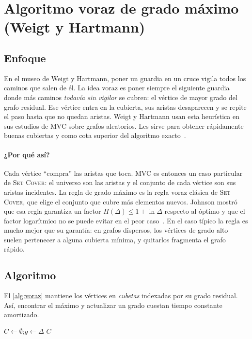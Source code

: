 \section{Algoritmo voraz de grado máximo (Weigt y Hartmann)}\label{sec:voraz}

\subsection{Enfoque}
En el museo de Weigt y Hartmann, poner un guardia en un cruce vigila todos los caminos que salen de él. La idea voraz es poner siempre el siguiente guardia donde más caminos \emph{todavía sin vigilar} se cubren: el vértice de mayor grado del grafo residual. Ese vértice entra en la cubierta, sus aristas desaparecen y se repite el paso hasta que no quedan aristas. Weigt y Hartmann usan esta heurística en sus estudios de MVC sobre grafos aleatorios. Les sirve para obtener rápidamente buenas cubiertas y como cota superior del algoritmo exacto~\citep{weigt2000,weigt2001}.

\paragraph{¿Por qué así?} Cada vértice ``compra'' las aristas que toca. MVC es entonces un caso particular de \textsc{Set Cover}: el universo son las aristas y el conjunto de cada vértice son sus aristas incidentes. La regla de grado máximo es la regla voraz clásica de \textsc{Set Cover}, que elige el conjunto que cubre más elementos nuevos. Johnson mostró que esa regla garantiza un factor $H(\Delta)\le 1+\ln\Delta$ respecto al óptimo y que el factor logarítmico no se puede evitar en el peor caso~\citep{johnson1974}. En el caso típico la regla es mucho mejor que su garantía: en grafos dispersos, los vértices de grado alto suelen pertenecer a alguna cubierta mínima, y quitarlos fragmenta el grafo rápido.

\subsection{Algoritmo}
El \cref{alg:voraz} mantiene los vértices en \emph{cubetas} indexadas por su grado residual. Así, encontrar el máximo y actualizar un grado cuestan tiempo constante amortizado.

\begin{algorithm}[!htbp]
\caption{$(G)$: voraz de grado máximo con cubetas}\label{alg:voraz}
$C\gets\emptyset$;\quad $g\gets\Delta$\;
\Return $C$\;
\end{algorithm}

